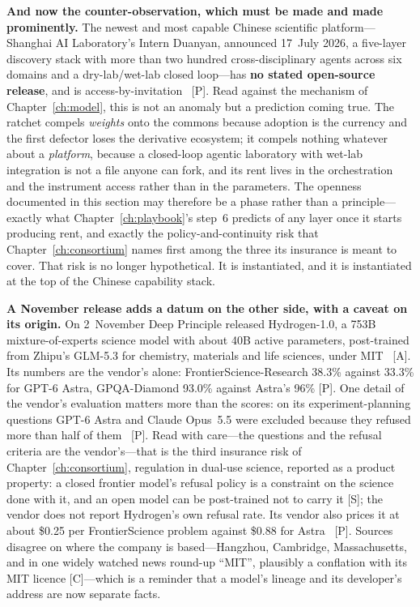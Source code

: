 \textbf{And now the counter-observation, which must be made and made prominently.} The newest and most capable Chinese scientific platform---Shanghai AI Laboratory's Intern Duanyan, announced 17~July 2026, a five-layer discovery stack with more than two hundred cross-disciplinary agents across six domains and a dry-lab/wet-lab closed loop---has \textbf{no stated open-source release}, and is access-by-invitation~\cite{intern-s1-2025} [P]. Read against the mechanism of Chapter~\ref{ch:model}, this is not an anomaly but a prediction coming true. The ratchet compels \emph{weights} onto the commons because adoption is the currency and the first defector loses the derivative ecosystem; it compels nothing whatever about a \emph{platform}, because a closed-loop agentic laboratory with wet-lab integration is not a file anyone can fork, and its rent lives in the orchestration and the instrument access rather than in the parameters. The openness documented in this section may therefore be a phase rather than a principle---exactly what Chapter~\ref{ch:playbook}'s step~6 predicts of any layer once it starts producing rent, and exactly the policy-and-continuity risk that Chapter~\ref{ch:consortium} names first among the three its insurance is meant to cover. That risk is no longer hypothetical. It is instantiated, and it is instantiated at the top of the Chinese capability stack.

\textbf{A November release adds a datum on the other side, with a caveat on its origin.} On 2~November Deep Principle released Hydrogen-1.0, a 753B mixture-of-experts science model with about 40B active parameters, post-trained from Zhipu's GLM-5.3 for chemistry, materials and life sciences, under MIT~\cite{lit-hydrogen} [A]. Its numbers are the vendor's alone: FrontierScience-Research 38.3\% against 33.3\% for GPT-6 Astra, GPQA-Diamond 93.0\% against Astra's 96\% [P]. One detail of the vendor's evaluation matters more than the scores: on its experiment-planning questions GPT-6 Astra and Claude Opus~5.5 were excluded because they refused more than half of them~\cite{lit-hydrogen} [P]. Read with care---the questions and the refusal criteria are the vendor's---that is the third insurance risk of Chapter~\ref{ch:consortium}, regulation in dual-use science, reported as a product property: a closed frontier model's refusal policy is a constraint on the science done with it, and an open model can be post-trained not to carry it [S]; the vendor does not report Hydrogen's own refusal rate. Its vendor also prices it at about \$0.25 per FrontierScience problem against \$0.88 for Astra~\cite{lit-berman-nov} [P]. Sources disagree on where the company is based---Hangzhou, Cambridge, Massachusetts, and in one widely watched news round-up ``MIT'', plausibly a conflation with its MIT licence [C]---which is a reminder that a model's lineage and its developer's address are now separate facts.

